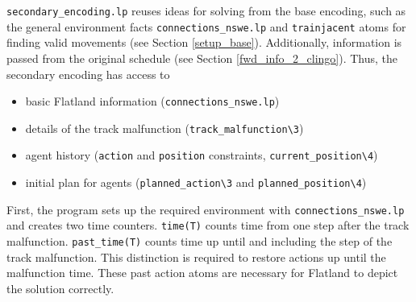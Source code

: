 \documentclass[runningheads]{llncs}
\begin{document}
\verb|secondary_encoding.lp| reuses ideas for solving from the base encoding, such as the general environment facts \verb|connections_nswe.lp| and \verb|trainjacent| atoms for finding valid movements (see Section \ref{setup_base}). Additionally, information is passed from the original schedule (see Section \ref{fwd_info_2_clingo}). Thus, the secondary encoding has access to 
\begin{itemize}
	\item basic Flatland information (\verb|connections_nswe.lp|)
	\item details of the track malfunction (\verb|track_malfunction\3|)
	\item agent history (\verb|action| and \verb|position| constraints, \verb|current_position\4|)
	\item {initial plan for agents (\verb|planned_action\3| and \verb|planned_position\4|)}
\end{itemize}

First, the program sets up the required environment with \verb|connections_nswe.lp| and creates two time counters. \verb|time(T)| counts time from one step after the track malfunction. \verb|past_time(T)| counts time up until and including the step of the track malfunction. This distinction is required to restore actions up until the malfunction time. These past action atoms are necessary for Flatland to depict the solution correctly.
\end{document}

